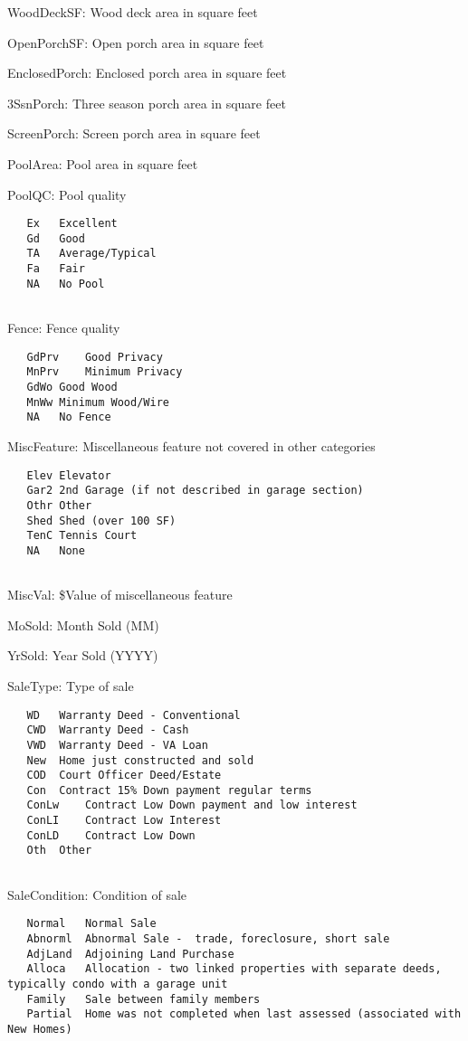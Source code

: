 \documentclass[]{article}
\begin{document}
WoodDeckSF: Wood deck area in square feet

OpenPorchSF: Open porch area in square feet

EnclosedPorch: Enclosed porch area in square feet

3SsnPorch: Three season porch area in square feet

ScreenPorch: Screen porch area in square feet

PoolArea: Pool area in square feet

PoolQC: Pool quality

\begin{verbatim}
   Ex   Excellent
   Gd   Good
   TA   Average/Typical
   Fa   Fair
   NA   No Pool
    
\end{verbatim}

Fence: Fence quality

\begin{verbatim}
   GdPrv    Good Privacy
   MnPrv    Minimum Privacy
   GdWo Good Wood
   MnWw Minimum Wood/Wire
   NA   No Fence
\end{verbatim}

MiscFeature: Miscellaneous feature not covered in other categories

\begin{verbatim}
   Elev Elevator
   Gar2 2nd Garage (if not described in garage section)
   Othr Other
   Shed Shed (over 100 SF)
   TenC Tennis Court
   NA   None
    
\end{verbatim}

MiscVal: \$Value of miscellaneous feature

MoSold: Month Sold (MM)

YrSold: Year Sold (YYYY)

SaleType: Type of sale

\begin{verbatim}
   WD   Warranty Deed - Conventional
   CWD  Warranty Deed - Cash
   VWD  Warranty Deed - VA Loan
   New  Home just constructed and sold
   COD  Court Officer Deed/Estate
   Con  Contract 15% Down payment regular terms
   ConLw    Contract Low Down payment and low interest
   ConLI    Contract Low Interest
   ConLD    Contract Low Down
   Oth  Other
    
\end{verbatim}

SaleCondition: Condition of sale

\begin{verbatim}
   Normal   Normal Sale
   Abnorml  Abnormal Sale -  trade, foreclosure, short sale
   AdjLand  Adjoining Land Purchase
   Alloca   Allocation - two linked properties with separate deeds, typically condo with a garage unit  
   Family   Sale between family members
   Partial  Home was not completed when last assessed (associated with New Homes)
\end{verbatim}
\end{document}
